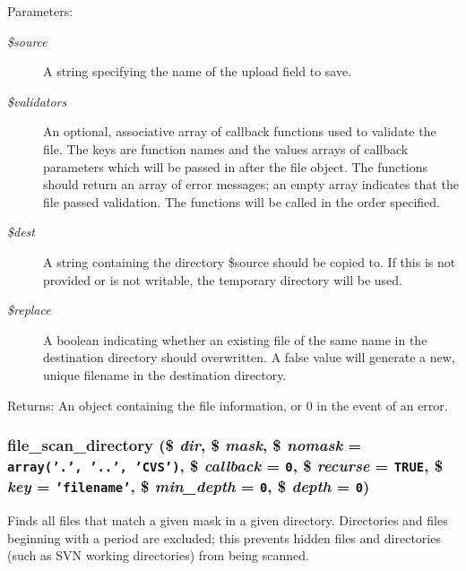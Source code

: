 \begin{Desc}
\item[Parameters:]
\begin{description}
\item[{\em \$source}]A string specifying the name of the upload field to save. \item[{\em \$validators}]An optional, associative array of callback functions used to validate the file. The keys are function names and the values arrays of callback parameters which will be passed in after the file object. The functions should return an array of error messages; an empty array indicates that the file passed validation. The functions will be called in the order specified. \item[{\em \$dest}]A string containing the directory \$source should be copied to. If this is not provided or is not writable, the temporary directory will be used. \item[{\em \$replace}]A boolean indicating whether an existing file of the same name in the destination directory should overwritten. A false value will generate a new, unique filename in the destination directory. \end{description}
\end{Desc}
\begin{Desc}
\item[Returns:]An object containing the file information, or 0 in the event of an error. \end{Desc}
\hypertarget{group__file_g374c73d3fe4f45c2d64a5fb0b22cb118}{
\subsubsection[{file\_\-scan\_\-directory}]{\setlength{\rightskip}{0pt plus 5cm}file\_\-scan\_\-directory (\$ {\em dir}, \/  \$ {\em mask}, \/  \$ {\em nomask} = {\tt array('.',~'..',~'CVS')}, \/  \$ {\em callback} = {\tt 0}, \/  \$ {\em recurse} = {\tt TRUE}, \/  \$ {\em key} = {\tt 'filename'}, \/  \$ {\em min\_\-depth} = {\tt 0}, \/  \$ {\em depth} = {\tt 0})}}
\label{group__file_g374c73d3fe4f45c2d64a5fb0b22cb118}


Finds all files that match a given mask in a given directory. Directories and files beginning with a period are excluded; this prevents hidden files and directories (such as SVN working directories) from being scanned.

